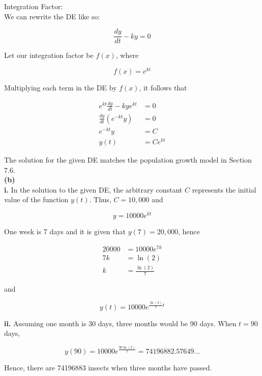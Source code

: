 \documentclass{article}
\begin{document}
    Integration Factor: \\

    We can rewrite the DE like so:

    \[
        \frac{dy}{dt} - ky = 0
    \]

    Let our integration factor be $f(x)$, where

    \[
        f(x) = e^{kt}
    \]

    Multiplying each term in the DE by $f(x)$, it follows that

    \begin{align*}
        e^{kt} \frac{dy}{dt} - ky e^{kt}    &= 0 \\
        \frac{dy}{dt}\left(e^{-kt}y\right)  &= 0 \\
        e^{-kt}y                            &= C \\
        y(t)                                   &= Ce^{kt}
    \end{align*}

    The solution for the given DE matches the population growth model in Section 7.6. \\

    \textbf{(b)} \\
    \textbf{i. } In the solution to the given DE, the arbitrary constant $C$ represents the initial value of the function $y(t)$. Thus, $C=10,000$ and

    \[
        y = 10000e^{kt}
    \]

    One week is 7 days and it is given that $y(7)=20,000$, hence

    \begin{align*}
        20000   &= 10000 e^{7k} \\
        7k      &= \ln{(2)} \\
        k       &= \frac{\ln{(2)}}{7}
    \end{align*}

    and

    \[
        y(t)    = 10000e^{\frac{\ln{(2)}}{7}t}
    \]

    \pagebreak
    \thispagestyle{3}

    \textbf{ii. } Assuming one month is 30 days, three months would be 90 days. When $t=90$ days,

    \[
        y(90) = 10000e^{\frac{90\ln{(2)}}{7}} = 74196882.57649\dots
    \]

    Hence, there are 74196883 insects when three months have passed.
\end{document}
